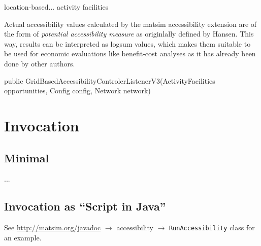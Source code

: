 location-based... activity facilities

Actual accessibility values calculated by the \gls{matsim} accessibility extension are of the form of \textit{potential 
	accessibility measure} as originlally defined by Hansen. This way, results can be interpreted as logsum values, 
which makes them suitable to be used for economic evaluations like benefit-cost analyses as it has already been done 
by other authors.




public GridBasedAccessibilityControlerListenerV3(ActivityFacilities opportunities, Config config, Network network)

\section{Invocation}

\subsection{Minimal}

...



\subsection{Invocation as \enquote{Script in Java}}

See \url{http://matsim.org/javadoc} $\to$ accessibility $\to$ \lstinline{RunAccessibility} class for an example.




